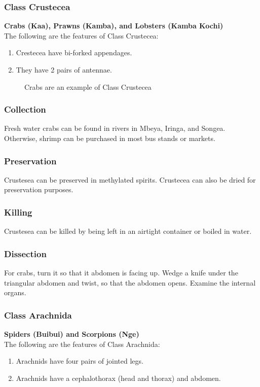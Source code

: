 \subsubsection{Class Crustecea}

\textbf{Crabs (Kaa), Prawns (Kamba), and Lobsters (Kamba Kochi)}\\
The following are the features of Class Crustecea:
\begin{enumerate}
\item{Crestecea have bi-forked appendages.}
\item{They have 2 pairs of antennae.}
\end{enumerate}

\begin{figure}[h]
\begin{center}
\def\svgwidth{6cm}

\caption{Crabs are an example of Class Crustecea}
\label{fig:crab}
\end{center}
\end{figure}

\subsubsection{Collection}
Fresh water crabs can be found in rivers in Mbeya, Iringa, and Songea. Otherwise, shrimp can be purchased in most bus stands or markets.

\subsubsection{Preservation} 
Crustesea can be preserved in methylated spirits. Crustecea can also be dried for preservation purposes.

\subsubsection{Killing}
Crustesea can be killed by being left in an airtight container or boiled in water.

\subsubsection{Dissection}
For crabs, turn it so that it abdomen is facing up. Wedge a knife under the triangular abdomen and twist, so that the abdomen opens. Examine the internal organs.
		
\subsubsection{Class Arachnida}
\textbf{Spiders (Buibui) and Scorpions (Nge)}\\
The following are the features of Class Arachnida:
\begin{enumerate}
\item{Arachnids have four pairs of jointed legs.}
\item{Arachnids have a cephalothorax (head and thorax) and abdomen.}
\end{enumerate}

